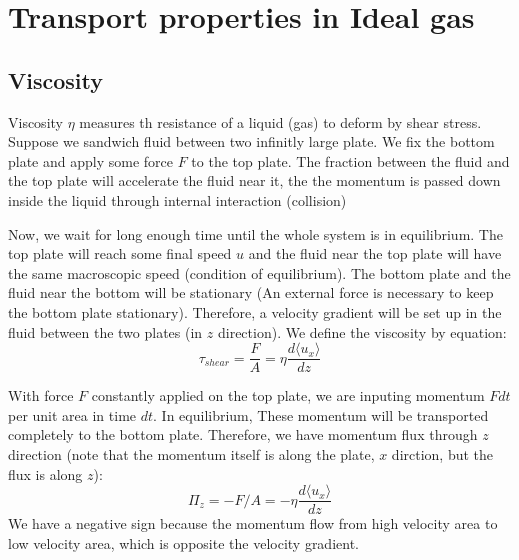 \documentclass{article}
\begin{document}
\section{Transport properties in Ideal gas}

\subsection{Viscosity}
Viscosity $\eta$ measures th resistance of a liquid (gas) to deform by shear stress. Suppose we sandwich fluid between 
two infinitly large plate. We fix the bottom plate and apply some force $F$ to the top plate. The fraction between the fluid and 
the top plate will accelerate the fluid near it, the the momentum is passed down inside the liquid through internal interaction (collision)

Now, we wait for long enough time until the whole system is in equilibrium. The top plate will reach some final speed $u$ and 
the fluid near the top plate will have the same macroscopic speed (condition of equilibrium). The bottom plate and the fluid near the bottom 
will be stationary (An external force is necessary to keep the bottom plate stationary). 
Therefore, a velocity gradient will be set up in the fluid between the two plates (in $z$ direction). We define 
the viscosity by equation:
\begin{equation}
    \tau_{shear} = \frac{F}{A} = \eta \frac{d \langle u_x \rangle}{dz}
\end{equation}

With force $F$ constantly applied on the top plate, we are inputing momentum $Fdt$ per unit area in time $dt$. In equilibrium, 
These momentum will be transported completely to the bottom plate. Therefore, we have momentum flux through $z$ direction 
(note that the momentum itself is along the plate, $x$ dirction, but the flux is along $z$):
\begin{equation}
    \Pi_z = - F / A = - \eta \frac{d \langle u_x \rangle}{dz}
\end{equation}
We have a negative sign because the momentum flow from high velocity area to low velocity area, which is opposite the velocity gradient.
\end{document}
